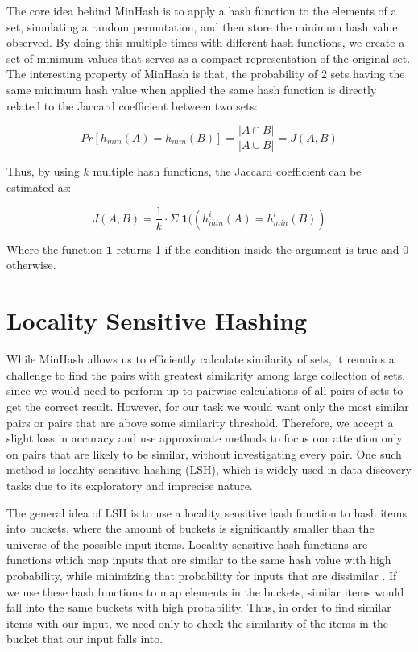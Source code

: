 The core idea behind MinHash is to apply a hash function to the elements of a set, simulating a random permutation, and then store the minimum hash value observed. By doing this multiple times with different hash functions, we create a set of minimum values that serves as a compact representation of the original set. The interesting property of MinHash is that, the probability of 2 sets having the same minimum hash value when applied the same hash function is directly related to the Jaccard coefficient between two sets:

\[Pr[h_{min}(A) = h_{min}(B)] = \frac{|A \cap B|}{|A \cup B|} = J(A, B)\]

Thus, by using \(k\) multiple hash functions, the Jaccard coefficient can be estimated as:

\[J(A, B) = \frac{1}{k} \cdot \Sigma \; \mathbf{1}((h^i_{min}(A) = h^i_{min}(B))\]

Where the function \(\mathbf{1}\) returns 1 if the condition inside the argument is true and 0 otherwise.

\section{Locality Sensitive Hashing} \label{lsh}

While MinHash allows us to efficiently calculate similarity of sets, it remains a challenge to find the pairs with greatest similarity among large collection of sets, since we would need to perform up to pairwise calculations of all pairs of sets to get the correct result. However, for our task we would want only the most similar pairs or pairs that are above some similarity threshold. Therefore, we accept a slight loss in accuracy and use approximate methods to focus our attention only on pairs that are likely to be similar, without investigating every pair. One such method is locality sensitive hashing (LSH), which is widely used in data discovery tasks due to its exploratory and imprecise nature. \cite{miningOfMassiveDatasets, lazo}

The general idea of LSH is to use a locality sensitive hash function to hash items into buckets, where the amount of buckets is significantly smaller than the universe of the possible input items. Locality sensitive hash functions are functions which map inputs that are similar to the same hash value with high probability, while minimizing that probability for inputs that are dissimilar \cite{lshDefinition}. If we use these hash functions to map elements in the buckets, similar items would fall into the same buckets with high probability. Thus, in order to find similar items with our input, we need only to check the similarity of the items in the bucket that our input falls into. 

